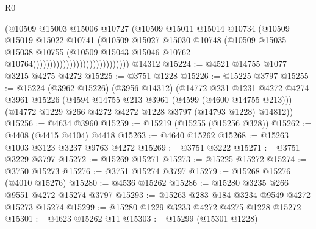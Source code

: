 \begin{lexlean}{R0}
\begin{coremodule}
                                                  (@10509
                                                    @15003
                                                    @15006
                                                    @10727
                                                    (@10509
                                                      @15011
                                                      @15014
                                                      @10734
                                                      (@10509
                                                        @15019
                                                        @15022
                                                        @10741
                                                        (@10509
                                                          @15027
                                                          @15030
                                                          @10748
                                                          (@10509
                                                            @15035
                                                            @15038
                                                            @10755
                                                            (@10509
                                                              @15043
                                                              @15046
                                                              @10762
                                                              @10764)))))))))))))))))))))))))))))
    @14312
@15224 := @4521 @14755 @1077 @3215 @4275 @4272
@15225 := @3751 @1228
@15226 := @15225 @3797
@15255 := @15224
    (@3962 @15226)
    (@3956 @14312)
    (@14772
      @231
      @1231
      @4272
      @4274
      @3961
      @15226
      (@4594 @14755 @213 @3961 (@4599 (@4600 @14755 @213)))
      (@14772 @1229 @266 @4272 @4272 @1228 @3797 (@14793 @1228) @14812))
@15256 := @4634 @3960
@15259 := @15219 (@15255 (@15256 @328))
@15262 := @4408 (@4415 @4104) @4418
@15263 := @4640 @15262
@15268 := @15263 @1003 @3123 @3237 @9763 @4272
@15269 := @3751 @3222
@15271 := @3751 @3229 @3797
@15272 := @15269 @15271
@15273 := @15225 @15272
@15274 := @3750 @15273
@15276 := @3751 @15274 @3797
@15279 := @15268 @15276 (@4010 @15276)
@15280 := @4536 @15262
@15286 := @15280 @3235 @266 @9551 @4272 @15274 @3797
@15293 := @15263 @283 @184 @3234 @9549 @4272 @15273 @15274
@15299 := @15280 @1229 @3233 @4272 @4275 @1228 @15272
@15301 := @4623 @15262 @11
@15303 := @15299 (@15301 @1228)

\end{coremodule}
\end{lexlean}
